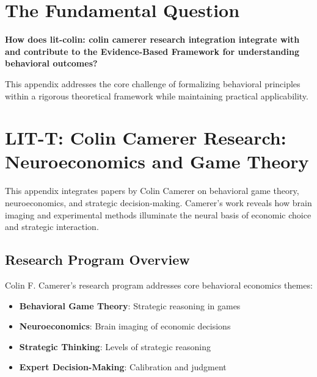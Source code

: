 \section{The Fundamental Question}
\label{sec:cam-fundamental}

\begin{tcolorbox}[
    colback=red!5!white,
    colframe=red!75!black,
    title={\textbf{Fundamental Question}}
]
\textbf{How does lit-colin: colin camerer research integration integrate with and contribute to the
Evidence-Based Framework for understanding behavioral outcomes?}

This appendix addresses the core challenge of formalizing behavioral principles
within a rigorous theoretical framework while maintaining practical applicability.
\end{tcolorbox}




\section{LIT-T: Colin Camerer Research: Neuroeconomics and Game Theory}
\label{app:litt}

This appendix integrates papers by Colin Camerer on behavioral game theory,
neuroeconomics, and strategic decision-making. Camerer's work reveals how brain imaging and
experimental methods illuminate the neural basis of economic choice and strategic interaction.

\subsection{Research Program Overview}

Colin F. Camerer's research program addresses core behavioral economics themes:

\begin{itemize}
  \item \textbf{Behavioral Game Theory}: Strategic reasoning in games
  \item \textbf{Neuroeconomics}: Brain imaging of economic decisions
  \item \textbf{Strategic Thinking}: Levels of strategic reasoning
  \item \textbf{Expert Decision-Making}: Calibration and judgment
\end{itemize}

